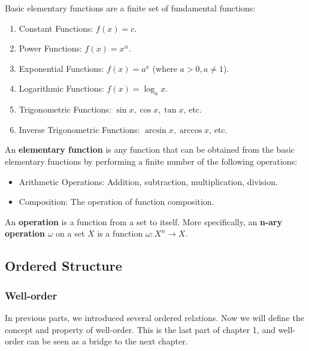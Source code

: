 \documentclass[oneside]{book}
\begin{document}
\begin{definition}
Basic elementary functions are a finite set of fundamental functions:
\begin{enumerate}
    \item Constant Functions: $f(x) = c$.
    \item Power Functions: $f(x) = x^\alpha$.
    \item Exponential Functions: $f(x) = a^x$ (where $a > 0, a \ne 1$).
    \item Logarithmic Functions: $f(x) = \log_a x$.
    \item Trigonometric Functions: $\sin x, \cos x, \tan x$, etc.
    \item Inverse Trigonometric Functions: $\arcsin x, \arccos x$, etc.
\end{enumerate}
\end{definition}

\begin{definition}
An \textbf{elementary function} is any function that can be obtained from the basic elementary functions by performing a finite number of the following operations:
\begin{itemize}
    \item Arithmetic Operations: Addition, subtraction, multiplication, division.
    \item Composition: The operation of function composition.
\end{itemize}
\end{definition}

\begin{definition}[Operation]
An \textbf{operation} is a function from a set to itself. More specifically, an \textbf{n-ary operation} $\omega$ on a set $X$ is a function $\omega: X^n \to X$.
\end{definition}

\subsection{Ordered Structure}

\subsubsection{Well-order}
In previous parts, we introduced several ordered relations. Now we will define the concept and property of well-order. This is the last part of chapter 1, and well-order can be seen as a bridge to the next chapter.
\end{document}
